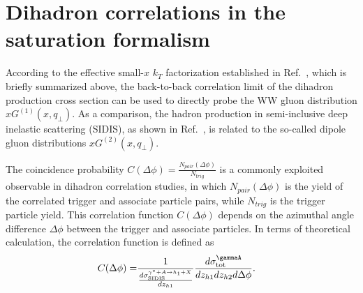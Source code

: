 \section{Dihadron correlations in the saturation formalism}\label{sec:dihadrontheory}

According to the effective small-$x$ $k_T$ factorization established in
Ref.~\cite{Dominguez:2011wm}, which is briefly summarized above, the
back-to-back correlation limit of the dihadron production cross section can be used
to directly probe the WW gluon distribution $xG^{(1)}(x,q_{\perp})$. As a
comparison, the hadron production in semi-inclusive deep inelastic scattering
(SIDIS), as shown in Ref.~\cite{Marquet:2009ca}, is related to the so-called
dipole gluon distributions $xG^{(2)}(x,q_{\perp})$.

The coincidence probability $C(\Delta\phi)=\frac{N_{pair}(\Delta\phi)}{N_{trig}}$ is a
commonly exploited observable in dihadron correlation studies, in which
$N_{pair}(\Delta\phi)$ is the yield of the correlated trigger and associate
particle pairs, while $N_{trig}$ is the trigger particle yield. This
correlation function $C(\Delta\phi)$ depends on the azimuthal angle difference $\Delta\phi$
between the trigger and associate particles. In terms of theoretical
calculation, the correlation function is defined as
\begin{eqnarray} 
C(\Delta\phi) 
= & \frac{1}{\frac{d\sigma^{\gamma^{*}+A\rightarrow h_{1}+X}_{\textrm{SIDIS}}}{dz_{h1}}}
\frac{d\sigma^{\gammaA}_{\textrm{tot}}}{dz_{h1}dz_{h2}d\Delta\phi}.
\label{eqn:cdphiCGC} 
\end{eqnarray}

